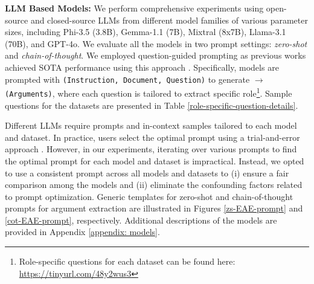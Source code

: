 \noindent
\textbf{LLM Based Models:} We perform comprehensive experiments using open-source and closed-source LLMs from different model families of various parameter sizes, including Phi-3.5 (3.8B), Gemma-1.1 (7B), Mixtral (8x7B), Llama-3.1 (70B), and GPT-4o. We evaluate all the models in two prompt settings: \textit{zero-shot} and \textit{chain-of-thought}. We employed question-guided prompting as previous works achieved SOTA performance using this approach \cite{lu-etal-2023-event,hsu-etal-2022-degree,du-cardie-2020-event}. Specifically, models are prompted with \texttt{(Instruction, Document, Question)} to generate  $\rightarrow$ \texttt{(Arguments)}, where each question is tailored to extract specific role\footnote{Role-specific questions for each dataset can be found here: \href{https://tinyurl.com/48y2wus3}{https://tinyurl.com/48y2wus3}}. Sample questions for the datasets are presented in Table \ref{role-specific-question-details}. 

Different LLMs require prompts and in-context samples tailored to each model and dataset. In practice, users select the optimal prompt using a trial-and-error approach \cite{ziems-etal-2024-large, 10.1145/3544548.3581388}. However, in our experiments, iterating over various prompts to find the optimal prompt for each model and dataset is impractical. Instead, we opted to use a consistent prompt across all models and datasets to (i) ensure a fair comparison among the models and (ii) eliminate the confounding factors related to prompt optimization.  Generic templates for zero-shot and chain-of-thought prompts for argument extraction are illustrated in Figures \ref{zs-EAE-prompt} and \ref{cot-EAE-prompt}, respectively. Additional descriptions of the models are provided in Appendix \ref{appendix: models}.


